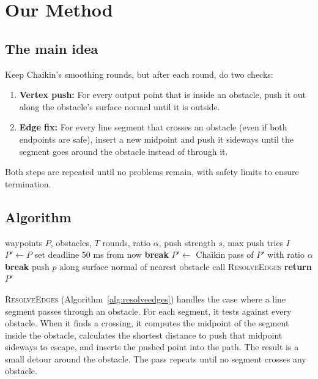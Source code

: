 \documentclass[10pt,a4paper,twocolumn]{article}
\begin{document}
\section{Our Method}

\subsection{The main idea}
Keep Chaikin's smoothing rounds, but after each round, do two checks:
\begin{enumerate}
  \item \textbf{Vertex push:} For every output point that is inside an
        obstacle, push it out along the obstacle's surface normal until
        it is outside.
  \item \textbf{Edge fix:} For every line segment that crosses an
        obstacle (even if both endpoints are safe), insert a new
        midpoint and push it sideways until the segment goes around
        the obstacle instead of through it.
\end{enumerate}
Both steps are repeated until no problems remain, with safety limits
to ensure termination.

\subsection{Algorithm}
\begin{algorithm}[H]\small
\caption{Collision-Aware Chaikin}\label{alg:cac}
\begin{algorithmic}[1]
\Require waypoints $P$, obstacles, $T$ rounds, ratio $\alpha$,
         push strength $s$, max push tries $I$
\State $P' \gets P$
\State set deadline 50 ms from now
   \textbf{break} \EndIf
  \State $P' \gets$ Chaikin pass of $P'$ with ratio $\alpha$
   
       \textbf{break} \EndIf
      \State push $p$ along surface normal of nearest obstacle
    \EndFor
  \EndFor
  \State call \textsc{ResolveEdges}        
\EndFor
\State \textbf{return} $P'$
\end{algorithmic}
\end{algorithm}

\textsc{ResolveEdges} (Algorithm~\ref{alg:resolveedges}) handles the
case where a line segment passes through an obstacle. For each segment,
it tests against every obstacle. When it finds a crossing, it computes
the midpoint of the segment inside the obstacle, calculates the
shortest distance to push that midpoint sideways to escape, and
inserts the pushed point into the path. The result is a small detour
around the obstacle. The pass repeats until no segment crosses any
obstacle.
\end{document}
